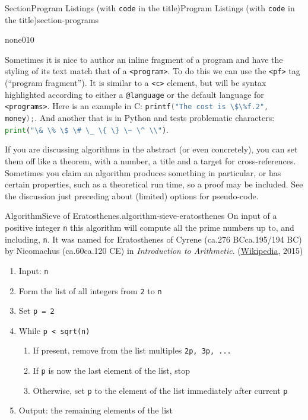 \documentclass[twoside,10pt,]{article}
\newcommand{\mono}[1]{\texttt{#1}}
\newcommand{\pubtitle}[1]{\textsl{#1}}
\numberwithin{equation}{section}
\newcommand{\programfragment}[2]{\lstinline[language=#1, style=programcodestyle, basicstyle=\ttfamily]#2}
\begin{document}
\begin{sectionptx}{Section}{Program Listings (with \mono{code} in the title)}{}{Program Listings (with \mono{code} in the title)}{}{}{section-programs}
\begin{program}{none}{0}{1}{0}
\end{program}
Sometimes it is nice to author an inline fragment of a program and have the styling of its text match that of a \mono{<program>}. To do this we can use the \mono{<pf>} tag (``program fragment'').  It is similar to a \mono{<c>} element, but will be syntax highlighted according to either a \mono{@language} or the default language for \mono{<programs>}. Here is an example in C: \programfragment{C}{`printf("The cost is \$\%f.2", money);`}. And another that is in Python and tests problematic characters: \programfragment{Python}{`print("\& \% \$ \# \_ \{ \} \~ \^ \\")`}.%
\par
If you are discussing algorithms in the abstract (or even concretely), you can set them off like a theorem, with a number, a title and a target for cross-references.  Sometimes you claim an algorithm produces something in particular, or has certain properties, such as a theoretical run time, so a proof may be included.  See the discussion just preceding about (limited) options for pseudo-code.%
\begin{algorithm}{Algorithm}{Sieve of Eratosthenes.}{}{algorithm-sieve-eratosthenes}%
On input of a positive integer \mono{n} this algorithm will compute all the prime numbers up to, and including, \mono{n}.  It was named for Eratosthenes of Cyrene (ca.\@ 276 BC\textendash{}ca.\@ 195\slash{}194 BC) by Nicomachus (ca.\@ 60\textendash{}ca.\@ 120 CE) in \pubtitle{Introduction to Arithmetic}. (\href{http://en.wikipedia.org/wiki/Sieve_of_Eratosthenes}{Wikipedia}\footnotemark{}, 2015)%
\begin{enumerate}
\item{}Input: \mono{n}%
\item{}Form the list of all integers from \mono{2} to \mono{n}%
\item{}Set \mono{p = 2}%
\item{}While \mono{p < sqrt(n)}%
\begin{enumerate}[label={\arabic*.}]
\item{}If present, remove from the list multiples \mono{2p, 3p, ...}%
\item{}If \mono{p} is now the last element of the list, stop%
\item{}Otherwise, set \mono{p} to the element of the list immediately after current \mono{p}%
\end{enumerate}
%
\item{}Output: the remaining elements of the list%
\end{enumerate}

\end{algorithm}
\end{sectionptx}
\end{document}
